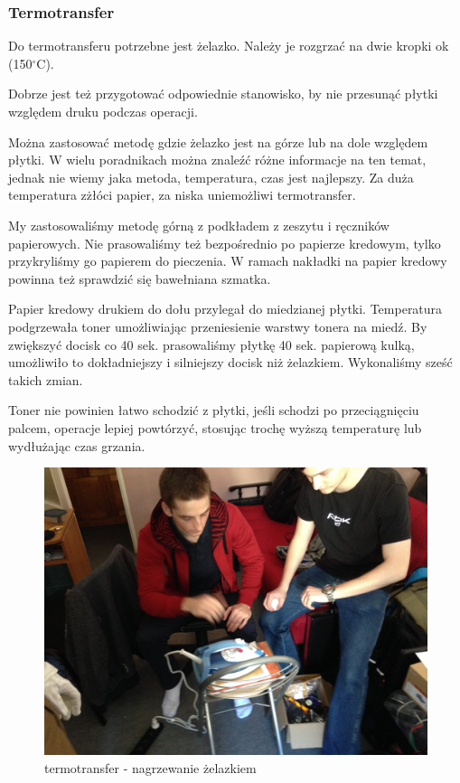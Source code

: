 \documentclass[a4paper,11pt]{article}
\def\SCALE{0.6}
\begin{document}
\subsubsection{Termotransfer}
Do termotransferu potrzebne jest żelazko. Należy je rozgrzać na dwie kropki ok (150$^\circ$C).

Dobrze jest też przygotować odpowiednie stanowisko, by nie przesunąć płytki względem druku podczas operacji.

Można zastosować metodę gdzie żelazko jest na górze lub na dole względem płytki. W wielu poradnikach można znaleźć różne informacje na ten temat, jednak nie wiemy jaka metoda, temperatura, czas jest najlepszy. Za duża temperatura zżłóci papier, za niska uniemożliwi termotransfer.

My zastosowaliśmy metodę górną z podkładem z zeszytu i ręczników papierowych. Nie prasowaliśmy też bezpośrednio po papierze kredowym, tylko przykryliśmy go papierem do pieczenia. W ramach nakładki na papier kredowy powinna też sprawdzić się bawełniana szmatka.

Papier kredowy drukiem do dołu przylegał do miedzianej płytki. Temperatura podgrzewała toner umożliwiając przeniesienie warstwy tonera na miedź. By zwiększyć docisk co 40 sek. prasowaliśmy płytkę 40 sek. papierową kulką, umożliwiło to dokładniejszy i silniejszy docisk niż żelazkiem. Wykonaliśmy sześć takich zmian.

Toner nie powinien łatwo schodzić z płytki, jeśli schodzi po przeciągnięciu palcem, operacje lepiej powtórzyć, stosując trochę wyższą temperaturę lub wydłużając czas grzania.
\begin{figure}[H]
	\centering
	\includegraphics[width=\SCALE
	\paperwidth]{termotransfer-1}
	\caption{termotransfer - nagrzewanie żelazkiem}
\end{figure}
\end{document}
